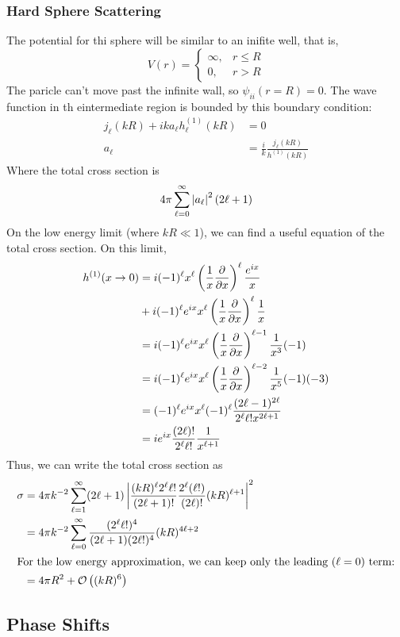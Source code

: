 \documentclass[a4paper]{article}
\begin{document}
\subsubsection{Hard Sphere Scattering}
The potential for thi sphere will be similar to an inifite well, that is,
\[
	V(r) = \begin{cases}
	\infty, & r \leq R\\
	0, & r > R
	\end{cases}
\]
The paricle can't move past the infinite wall, so $\psi_{ii}(r=R)=0$. The wave
function in th eintermediate region is bounded by this boundary condition:
\begin{align*}
	j_\ell(kR) + ika_\ell h^{(1)}_\ell(kR) &= 0\\
	a_\ell &= \frac{i}{k}\frac{j_\ell(kR)}{h^{(1)}(kR)}
\end{align*}
Where the total cross section is
\[
	4\pi\sum_{\ell=0}^\infty\left\lvert a_\ell\right\rvert^2(2\ell+1)
\]
On the low energy limit (where $kR \ll 1$), we can find a useful equation of
the total cross section. On this limit,
\begin{align*}
	h^{(1)}(x\to 0) &= i(-1)^\ell x^\ell\left(\frac{1}{x}\pd{x}\right)^\ell
	\frac{e^{ix}}{x}\\
	&+i(-1)^\ell e^{ix} x^\ell \left(\frac{1}{x}\pd{x}\right)^\ell
	\frac{1}{x}\\
	&=i(-1)^\ell e^{ix} x^\ell \left(\frac{1}{x}\pd{x}\right)^{\ell-1}
	\frac{1}{x^3}(-1)\\
	&=i(-1)^\ell e^{ix} x^\ell \left(\frac{1}{x}\pd{x}\right)^{\ell-2}
	\frac{1}{x^5}(-1)(-3)\\
	&= (-1)^\ell e^{ix} x^\ell (-1)^\ell\frac{(2\ell-1)^{2\ell}}{2^\ell
		\ell! x^{2\ell+1}}\\
	&= i e^{ix}\frac{(2\ell)!}{2^\ell \ell!}\frac{1}{x^{\ell+1}}
\end{align*}
Thus, we can write the total cross section as
\begin{align*}
	\sigma &= 4\pi k^{-2} \sum_{\ell=1}^\infty (2\ell+1)
	\left\lvert \frac{(kR)^\ell2^\ell \ell!}{(2\ell+1)!}
	\frac{2^\ell(\ell!)}{(2\ell)!}(kR)^{\ell+1}\right\rvert^2\\
	&= 4\pi k^{-2} \sum_{\ell=0}^\infty \frac{(2^\ell
	\ell!)^4}{(2\ell+1)(2\ell!)^4} (kR)^{4\ell+2}\\
\intertext{For the low energy approximation, we can keep only the leading
($\ell=0$) term:}
	&= 4\pi R^2 + \mathcal{O}\left((kR)^6\right)
\end{align*}

\subsection{Phase Shifts}
\end{document}
